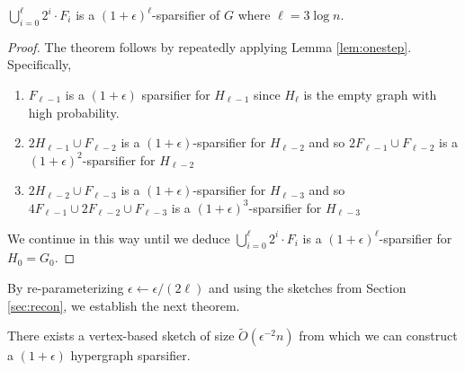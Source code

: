 \begin{theorem}
$\bigcup_{i=0}^\ell 2^i \cdot F_i $ is a $(1+\epsilon)^\ell$-sparsifier of $G$ where $\ell=3\log n$.
\end{theorem}
\begin{proof}
The theorem follows by repeatedly applying Lemma \ref{lem:onestep}. Specifically,
\begin{enumerate}
\item $F_{\ell-1}$ is a $(1+\epsilon)$ sparsifier for $H_{\ell-1}$ since $H_\ell$ is the empty graph with high probability. 
\item $2 H_{\ell-1} \cup F_{\ell-2}$ is a $(1+\epsilon)$-sparsifier for $H_{\ell-2}$ and so $2 F_{\ell-1} \cup F_{\ell-2}$ is a $(1+\epsilon)^2$-sparsifier for $H_{\ell-2}$
\item $2 H_{\ell-2} \cup F_{\ell-3}$ is a $(1+\epsilon)$-sparsifier for $H_{\ell-3}$
and so $4 F_{\ell-1} \cup 2 F_{\ell-2} \cup F_{\ell-3}$ is a $(1+\epsilon)^3$-sparsifier for $H_{\ell-3}$
\end{enumerate}
We continue in this way until we deduce $\bigcup_{i=0}^\ell 2^i \cdot F_i $ is a $(1+\epsilon)^\ell$-sparsifier for $H_0=G_0$.
\end{proof}

By re-parameterizing $\epsilon \leftarrow \epsilon/(2\ell)$ and using the sketches from Section \ref{sec:recon}, we establish the next theorem.
\begin{theorem}There exists a vertex-based sketch of size $\tilde{O}(\epsilon^{-2} n)$ from which we can construct a $(1+\epsilon)$ hypergraph sparsifier.\end{theorem}


